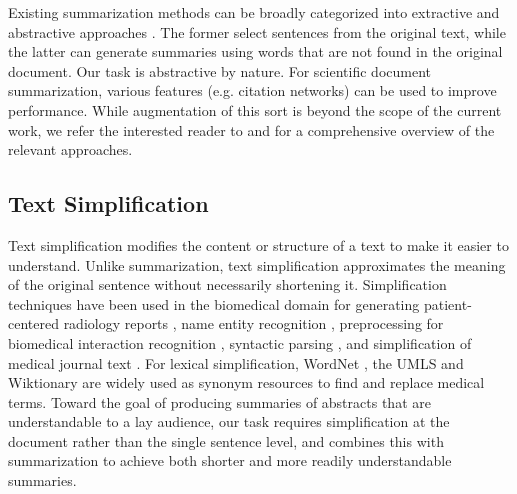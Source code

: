 \documentclass[letterpaper, table]{article} %
\begin{document}
Existing summarization methods can be broadly categorized into extractive and abstractive approaches \cite{Andr2007ASO}. The former \cite{Erkan2004LexRankGC, Cheng2016NeuralSB} select sentences from the original text, while the latter \cite{rush2015abstractive, nallapati2016abstractive} can generate summaries using words that are not found in the original document. Our task is abstractive by nature. For scientific document summarization, various features (e.g. citation networks) can be used to improve performance. While augmentation of this sort is beyond the scope of the current work, we refer the interested reader to \citet{Altmami2020AutomaticSO} and \citet{ Moradi2019TextSI} for a  comprehensive overview of the relevant approaches.
\subsection{Text Simplification} 
Text simplification \cite{Shardlow2014ASO} modifies the content or structure of a text to make it easier to understand. Unlike summarization, text simplification approximates the meaning of the original sentence without necessarily shortening it.
Simplification techniques have been used in the biomedical domain for generating patient-centered radiology reports \cite{qenam2017text}, name entity recognition \cite{habibi2017deep}, preprocessing for biomedical interaction recognition \cite{baumgartner2008concept}, syntactic parsing \cite{jonnalagadda2010towards}, and simplification of medical journal text \cite{jonnalagadda2010towards}. For lexical simplification, WordNet \cite{miller1995wordnet}, the UMLS \cite{bodenreider2004unified} and Wiktionary \cite{zesch2008extracting} are widely used as synonym resources to find and replace medical terms. Toward the goal of producing summaries of abstracts that are understandable to a lay audience, our task requires simplification at the document rather than the single sentence level, and combines this with summarization to achieve both shorter and more readily 
understandable summaries.
\end{document}
